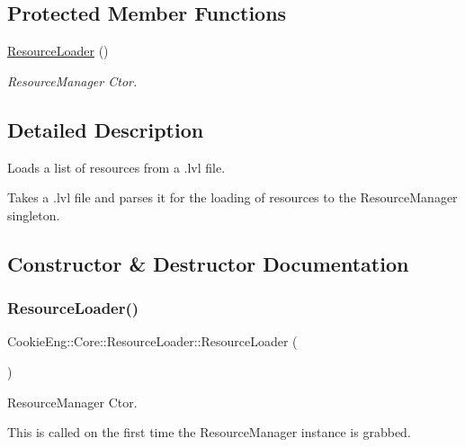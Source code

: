 \subsection*{Protected Member Functions}
\begin{DoxyCompactItemize}
\item 
\hyperlink{class_cookie_eng_1_1_core_1_1_resource_loader_aebcd3776b276c8af971f3c338ca13870}{Resource\+Loader} ()
\begin{DoxyCompactList}\small\item\em Resource\+Manager Ctor. \end{DoxyCompactList}\end{DoxyCompactItemize}


\subsection{Detailed Description}
Loads a list of resources from a .lvl file. 

Takes a .lvl file and parses it for the loading of resources to the Resource\+Manager singleton. 

\subsection{Constructor \& Destructor Documentation}
\mbox{\label{class_cookie_eng_1_1_core_1_1_resource_loader_aebcd3776b276c8af971f3c338ca13870}} 
\subsubsection{\texorpdfstring{Resource\+Loader()}{ResourceLoader()}}
{\footnotesize\ttfamily Cookie\+Eng\+::\+Core\+::\+Resource\+Loader\+::\+Resource\+Loader (\begin{DoxyParamCaption}{ }\end{DoxyParamCaption})\hspace{0.3cm}{\ttfamily [protected]}}



Resource\+Manager Ctor. 

This is called on the first time the Resource\+Manager instance is grabbed. 

